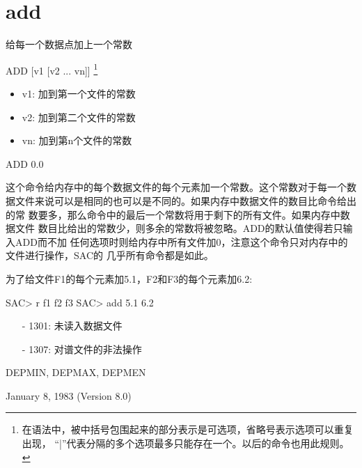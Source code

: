 \section{add}
\label{cmd:add}

给每一个数据点加上一个常数

ADD [v1 [v2 ... vn]]
\footnote{
在语法中，被中括号包围起来的部分表示是可选项，省略号表示选项可以重复出现，
``|''代表分隔的多个选项最多只能存在一个。以后的命令也用此规则。
}

\begin{itemize}
\item v1:  加到第一个文件的常数
\item v2:  加到第二个文件的常数
\item vn:  加到第n个文件的常数
\end{itemize}

ADD 0.0

这个命令给内存中的每个数据文件的每个元素加一个常数。这个常数对于每一个数
据文件来说可以是相同的也可以是不同的。如果内存中数据文件的数目比命令给出的常
数要多，那么命令中的最后一个常数将用于剩下的所有文件。如果内存中数据文件
数目比给出的常数少，则多余的常数将被忽略。ADD的默认值使得若只输入ADD而不加
任何选项时则给内存中所有文件加0，注意这个命令只对内存中的文件进行操作，SAC的
几乎所有命令都是如此。


为了给文件F1的每个元素加5.1，F2和F3的每个元素加6.2:
\begin{SACCode}
SAC> r f1 f2 f3
SAC> add 5.1 6.2
\end{SACCode}

\begin{itemize}
\item[-]1301: 未读入数据文件
\item[-]1307: 对谱文件的非法操作
\end{itemize}

DEPMIN, DEPMAX, DEPMEN

January 8, 1983 (Version 8.0)
